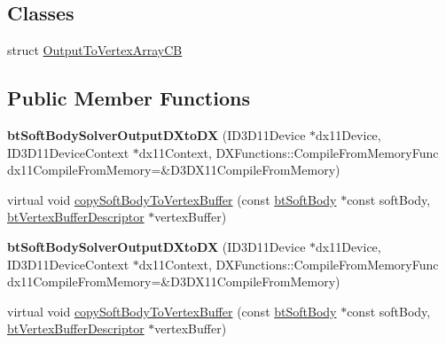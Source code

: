 \subsection*{Classes}
\begin{DoxyCompactItemize}
\item 
struct \hyperlink{structbtSoftBodySolverOutputDXtoDX_1_1OutputToVertexArrayCB}{Output\+To\+Vertex\+Array\+CB}
\end{DoxyCompactItemize}
\subsection*{Public Member Functions}
\begin{DoxyCompactItemize}
\item 
\mbox{\label{classbtSoftBodySolverOutputDXtoDX_a44a6df40918be2895144e74f1e4c36a2}} 
{\bfseries bt\+Soft\+Body\+Solver\+Output\+D\+Xto\+DX} (I\+D3\+D11\+Device $\ast$dx11\+Device, I\+D3\+D11\+Device\+Context $\ast$dx11\+Context, D\+X\+Functions\+::\+Compile\+From\+Memory\+Func dx11\+Compile\+From\+Memory=\&D3\+D\+X11\+Compile\+From\+Memory)
\item 
virtual void \hyperlink{classbtSoftBodySolverOutputDXtoDX_ab1bb3e5dd8a6e45ad6063398682806cb}{copy\+Soft\+Body\+To\+Vertex\+Buffer} (const \hyperlink{classbtSoftBody}{bt\+Soft\+Body} $\ast$const soft\+Body, \hyperlink{classbtVertexBufferDescriptor}{bt\+Vertex\+Buffer\+Descriptor} $\ast$vertex\+Buffer)
\item 
\mbox{\label{classbtSoftBodySolverOutputDXtoDX_a44a6df40918be2895144e74f1e4c36a2}} 
{\bfseries bt\+Soft\+Body\+Solver\+Output\+D\+Xto\+DX} (I\+D3\+D11\+Device $\ast$dx11\+Device, I\+D3\+D11\+Device\+Context $\ast$dx11\+Context, D\+X\+Functions\+::\+Compile\+From\+Memory\+Func dx11\+Compile\+From\+Memory=\&D3\+D\+X11\+Compile\+From\+Memory)
\item 
virtual void \hyperlink{classbtSoftBodySolverOutputDXtoDX_aac21bd05d5f1a2afb9ee855554ac13f1}{copy\+Soft\+Body\+To\+Vertex\+Buffer} (const \hyperlink{classbtSoftBody}{bt\+Soft\+Body} $\ast$const soft\+Body, \hyperlink{classbtVertexBufferDescriptor}{bt\+Vertex\+Buffer\+Descriptor} $\ast$vertex\+Buffer)
\end{DoxyCompactItemize}
